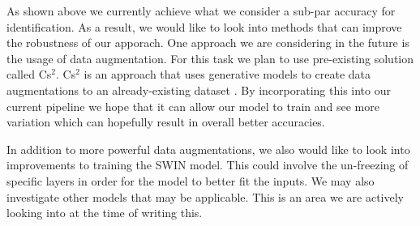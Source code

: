 \documentclass[10pt,twocolumn,letterpaper]{article}
\begin{document}
As shown above we currently achieve what we consider a sub-par accuracy for identification. As a result, we would like to look into methods that can improve the robustness of our apporach. One approach we are considering in the future is the usage of data augmentation. For this task we plan to use pre-existing solution called Cs$^2$. Cs$^2$ is an approach that uses generative models to create data augmentations to an already-existing dataset \cite{cs2}. By incorporating this into our current pipeline we hope that it can allow our model to train and see more variation which can hopefully result in overall better accuracies.  \par

In addition to more powerful data augmentations, we also would like to look into improvements to training the SWIN model. This could involve the un-freezing of specific layers in order for the model to better fit the inputs. We may also investigate other models that may be applicable. This is an area we are actively looking into at the time of writing this. \par 










{\small


}
\end{document}
